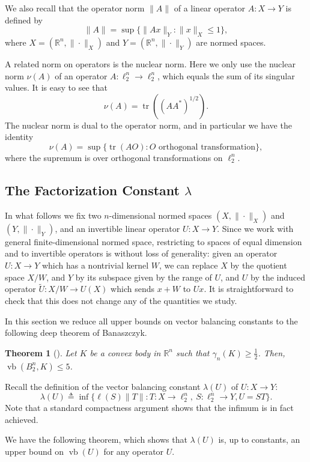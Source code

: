 \documentclass[11pt]{article}
\newtheorem{theorem}{Theorem}
\newcommand{\R}{{\mathbb{R}}}
\newcommand{\eqdef}{\triangleq}
\DeclareMathOperator{\vb}{vb}
\DeclareMathOperator{\tr}{tr}
\begin{document}
We also recall that the operator norm $\|A\|$ of a linear operator
$A:X \to Y$ is defined by 
\[
\|A\| = \sup\{\|Ax\|_Y: \|x\|_X \le 1\},
\]
where $X = (\R^n, \|\cdot\|_X)$ and $Y = (\R^n, \|\cdot\|_Y)$ are
normed spaces. 

A related norm on operators is the nuclear norm. Here we only use the
nuclear norm $\nu(A)$ of an operator $A:\ell_2^n \to \ell_2^n$, which
equals the sum of its singular values. It is easy to see that
\[
\nu(A) = \tr((AA^*)^{1/2}).
\]
The nuclear norm is dual to the operator norm, and in particular we
have the identity
\[
\nu(A) = \sup\{\tr(AO): O \text{ orthogonal transformation}\},
\]
where the supremum is over orthogonal transformations on $\ell_2^n$. 


\subsection{The Factorization Constant $\lambda$}

In what follows we fix two $n$-dimensional normed spaces $(X,
\|\cdot\|_X)$ and $(Y,\|\cdot\|_Y)$, and an invertible linear operator
$U:X \to Y$. Since we work with general finite-dimensional normed
space, restricting to spaces of equal dimension and to invertible
operators is without loss of generality: given an operator $U:X \to Y$
which has a nontrivial kernel $W$, we can replace $X$ by the
quotient space $X/W$, and $Y$ by its subspace given by the range of
$U$, and $U$ by the induced operator $\tilde{U}:X/W \to U(X)$ which
sends $x+W$ to $Ux$. It is straightforward to check that this does not
change any of the quantities we study.

In this section we reduce all upper bounds on vector balancing
constants to the following deep theorem of Banaszczyk.
\begin{theorem}[\cite{bana}]\label{thm:bana}
  Let $K$ be a convex body in $\R^n$ such that $\gamma_n(K) \ge
  \frac12$. Then, $\vb(B_2^n, K) \le 5$.
\end{theorem}

Recall the definition of the vector balancing constant $\lambda(U)$ of
$U:X \to Y$: 
\[
\lambda(U) \eqdef \inf \{\ell(S)\|T\|: T: X \to \ell_2^n,\ S: \ell_2^n
\to Y, U = ST\}.
\]
Note that a standard compactness argument shows that the infimum is in fact achieved. 

We have the following theorem, which shows that $\lambda(U)$ is, up to
constants, an upper bound on $\vb(U)$ for any operator $U$. 
\end{document}

